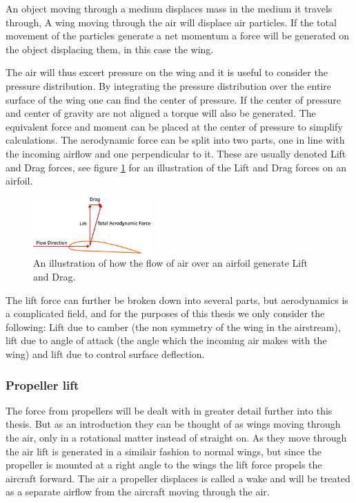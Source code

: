 An object moving through a medium displaces mass in the medium it travels through,
A wing moving through the air will displace air particles.
If the total movement of the particles generate a net momentum a force will be generated on the object displacing them, in this case the wing.

The air will thus excert pressure on the wing and it is useful to consider the pressure distribution.
By integrating the pressure distribution over the entire surface of the wing one can find the center of pressure.\cite{aerodynamics}
If the center of pressure and center of gravity are not aligned a torque will also be generated.
The equivalent force and moment can be placed at the center of pressure to simplify calculations.
The aerodynamic force can be split into two parts, one in line with the incoming airflow and one perpendicular to it.
These are usually denoted Lift and Drag forces, see figure \ref{fig:liftdrag} for an illustration of the Lift and Drag forces on an airfoil.

\begin{figure}[h]
    \center
    \includegraphics[width=0.4\textwidth]{liftdrag.png}
    \caption{An illustration of how the flow of air over an airfoil generate Lift and Drag. \cite{liftdragpng}}
    \label{fig:liftdrag}
\end{figure}

The lift force can further be broken down into several parts, but aerodynamics is a complicated field, and for the purposes of this thesis we only consider the following:
Lift due to camber (the non symmetry of the wing in the airstream), lift due to angle of attack (the angle which the incoming air makes with the wing) and lift due to control surface deflection.

\subsubsection{Propeller lift}
The force from propellers will be dealt with in greater detail further into this thesis.
But as an introduction they can be thought of as wings moving through the air, only in a rotational matter instead of straight on. 
As they move through the air lift is generated in a similair fashion to normal wings, but since the propeller is mounted at a right angle to the wings the lift force propels the aircraft forward.
The air a propeller displaces is called a wake and will be treated as a separate airflow from the aircraft moving through the air.


